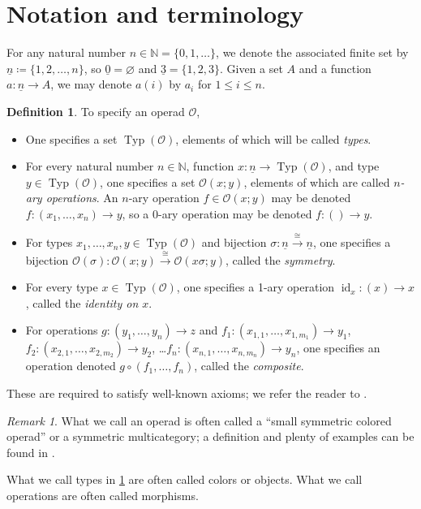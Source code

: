 \documentclass[11pt, article, oneside]{memoir}
\theoremstyle{plain}
\theoremstyle{definition}
\newtheorem{definition}[theorem]{Definition}
\theoremstyle{remark}
\newtheorem{remark}[theorem]{Remark}
\newcommand{\cat}[1]{\mathcal{#1}}
\DeclareMathOperator{\id}{id}
\DeclareMathOperator{\Typ}{Typ}
\newcommand{\NN}{\mathbb{N}}
\newcommand{\To}[1]{\xrightarrow{#1}}
\newcommand{\ul}[1]{\underline{#1}}
\newcommand{\OO}{\cat{O}}
\begin{document}
\section{Notation and terminology}

For any natural number $n\in\NN=\{0,1,\ldots\}$, we denote the associated finite set by $\ul{n}\coloneqq\{1,2,\ldots,n\}$, so $\ul{0}=\varnothing$ and $\ul{3}=\{1,2,3\}$. Given a set $A$ and a function $a\colon\ul{n}\to A$, we may denote $a(i)$ by $a_i$ for $1\leq i\leq n$.

\begin{definition}\label{def.operad}
To specify an operad $\OO$,
\begin{itemize}
	\item One specifies a set $\Typ(\OO)$, elements of which will be called \emph{types}.
	\item For every natural number $n\in\NN$, function $x\colon\ul{n}\to\Typ(\OO)$, and type $y\in\Typ(\OO)$, one specifies a set $\OO(x;y)$, elements of which are called \emph{$n$-ary operations}. An $n$-ary operation $f\in\OO(x;y)$ may be denoted $f\colon(x_1,\ldots,x_n)\to y$, so a $0$-ary operation may be denoted $f\colon()\to y$.
	\item For types $x_1,\ldots,x_n,y\in\Typ(\OO)$ and bijection $\sigma\colon\ul{n}\To{\cong}\ul{n}$, one specifies a bijection $\OO(\sigma)\colon\OO(x;y)\To\cong\OO(x\sigma;y)$, called the \emph{symmetry}.
	\item For every type $x\in\Typ(\OO)$, one specifies a 1-ary operation $\id_x\colon(x)\to x$, called the \emph{identity on $x$}.
	\item For operations $g\colon(y_1,\ldots,y_n)\to z$ and $f_1\colon(x_{1,1},\ldots,x_{1,m_1})\to y_1$, $f_2\colon(x_{2,1},\ldots,x_{2,m_2})\to y_2$, \ldots $f_n\colon(x_{n,1},\ldots,x_{n,m_n})\to y_n$, one specifies an operation denoted $g\circ(f_1,\ldots,f_n)$, called the \emph{composite}.
\end{itemize}
These are required to satisfy well-known axioms; we refer the reader to \cite[Definition 2.2.21(?)]{Leinster:2004a}.
\end{definition}

\begin{remark}
What we call an operad is often called a ``small symmetric colored operad'' or a symmetric multicategory; a definition and plenty of examples can be found in \cite{Leinster:2004a}.

What we call types in \cref{def.operad} are often called colors or objects. What we call operations are often called morphisms.
\end{remark}
\end{document}
